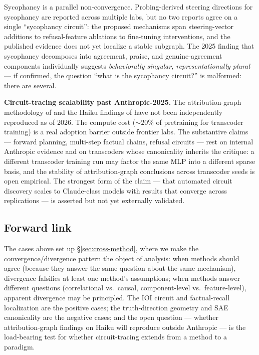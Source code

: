 Sycophancy is a parallel non-convergence. Probing-derived steering
directions for sycophancy are reported across multiple labs, but no
two reports agree on a single ``sycophancy circuit'': the proposed
mechanisms span steering-vector additions to refusal-feature
ablations to fine-tuning interventions, and the published evidence
does not yet localize a stable subgraph. The 2025 finding that
sycophancy decomposes into agreement, praise, and genuine-agreement
components individually suggests \emph{behaviorally singular,
representationally plural} --- if confirmed, the question ``what is
the sycophancy circuit?'' is malformed: there are several.

\begin{contradiction}
\textbf{Circuit-tracing scalability past Anthropic-2025.} The
attribution-graph methodology of \citet{lindsey2025-circuit-tracing}
and the Haiku findings of \citet{lindsey2025-biology} have not been
independently reproduced as of 2026. The compute cost
($\sim\!20\%$ of pretraining for transcoder training) is a real
adoption barrier outside frontier labs. The substantive claims
--- forward planning, multi-step factual chains, refusal circuits ---
rest on internal Anthropic evidence and on transcoders whose
canonicality inherits the \citet{leask2025-sae-not-canonical}
critique: a different transcoder training run may factor the same MLP
into a different sparse basis, and the stability of attribution-graph
conclusions across transcoder seeds is open empirical. The strongest
form of the claim --- that automated circuit discovery scales to
Claude-class models with results that converge across replications
--- is asserted but not yet externally validated.
\end{contradiction}

\subsection{Forward link}
\label{sec:circuit-forward}

The cases above set up \S\ref{sec:cross-method}, where we make the
convergence/divergence pattern the object of analysis: when methods
should agree (because they answer the same question about the same
mechanism), divergence falsifies at least one method's assumptions;
when methods answer different questions (correlational vs.\ causal,
component-level vs.\ feature-level), apparent divergence may be
principled. The IOI circuit and factual-recall localization are the
positive cases; the truth-direction geometry and SAE canonicality are
the negative cases; and the open question --- whether attribution-graph
findings on Haiku will reproduce outside Anthropic --- is the load-bearing
test for whether circuit-tracing extends from a method to a paradigm.
